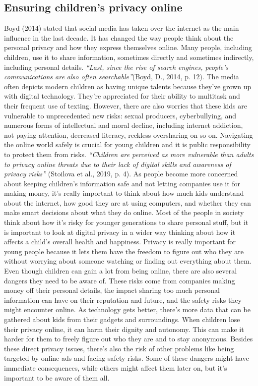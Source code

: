 \documentclass[a4paper, 10 pt, conference]{ieeeconf}  %
\begin{document}
\subsection{Ensuring children’s privacy online}
Boyd (2014) stated that social media has taken over the internet as the main influence in the last decade. It has changed the way people think about the personal privacy and how they express themselves online. Many people, including children, use it to share information, sometimes directly and sometimes indirectly, including personal details. \textit{“Last, since the rise of search engines, people’s communications are also often searchable”}(Boyd, D., 2014, p. 12). The media often depicts modern children as having unique talents because they’ve grown up with digital technology. They’re appreciated for their ability to multitask and their frequent use of texting. However, there are also worries that these kids are vulnerable to unprecedented new risks: sexual producers, cyberbullying, and numerous forms of intellectual and moral decline, including internet addiction, not paying attention, decreased literacy, reckless oversharing on so on. Navigating the online world safely is crucial for young children and it is public responsibility to protect them from risks.
\textit{“Children are perceived as more vulnerable than adults to privacy online threats due to their lack of digital skills and awareness of privacy risks”} (Stoilova et al., 2019, p. 4). As people become more concerned about keeping children's information safe and not letting companies use it for making money, it's really important to think about how much kids understand about the internet, how good they are at using computers, and whether they can make smart decisions about what they do online. Most of the people in society think about how it’s risky for younger generations to share personal stuff, but it is important to look at digital privacy in a wider way thinking about how it affects a child’s overall health and happiness. Privacy is really important for young people because it lets them have the freedom to figure out who they are without worrying about someone watching or finding out everything about them.
\\ Even though children can gain a lot from being online, there are also several dangers they need to be aware of. These risks come from companies making money off their personal details, the impact sharing too much personal information can have on their reputation and future, and the safety risks they might encounter online. As technology gets better, there's more data that can be gathered about kids from their gadgets and surroundings. When children lose their privacy online, it can harm their dignity and autonomy. This can make it harder for them to freely figure out who they are and to stay anonymous. Besides these direct privacy issues, there's also the risk of other problems like being targeted by online ads and facing safety risks. Some of these dangers might have immediate consequences, while others might affect them later on, but it's important to be aware of them all.
\end{document}
